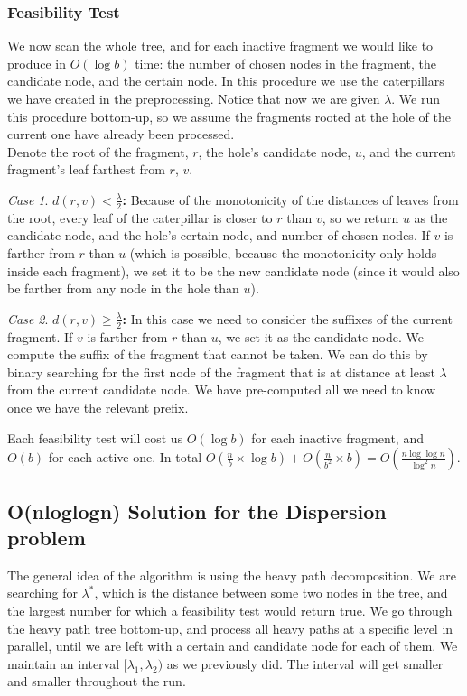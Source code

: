 \documentclass[11pt,a4paper]{article}
\theoremstyle{definition}
\theoremstyle{remark}
\newtheorem{case}{Case}
\begin{document}
\subsubsection{Feasibility Test} %
We now scan the whole tree, and for each inactive fragment we would like to produce in $O(\log b)$ time: the number of chosen nodes in the fragment, the candidate node, and the certain node. In this procedure we use the caterpillars we have created in the preprocessing. Notice that now we are given $\lambda$.
We run this procedure bottom-up, so we assume the fragments rooted at the hole of the current one have already been processed.\\
Denote the root of the fragment, $r$, the hole's candidate node, $u$, and the current fragment's leaf farthest from $r$, $v$.\\
\begin{case}
\textbf{$d(r,v) < \frac{\lambda}{2}$:} Because of the monotonicity of the distances of leaves from the root, every leaf of the caterpillar is closer to $r$ than $v$, so we return $u$ as the candidate node, and the hole's certain node, and number of chosen nodes. If $v$ is farther from $r$ than $u$ (which is possible, because the monotonicity only holds inside each fragment), we set it to be the new candidate node (since it would also be farther from any node in the hole than $u$).
\end{case}
\begin{case}
\textbf{$d(r,v) \geq \frac{\lambda}{2}$:}
In this case we need to consider the suffixes of the current fragment. If $v$ is farther from $r$ than $u$, we set it as the candidate node. We compute the suffix of the fragment that cannot be taken. We can do this by binary searching for the first node of the fragment that is at distance at least $\lambda$ from the current candidate node. We have pre-computed all we need to know once we have the relevant prefix.
\end{case}
Each feasibility test will cost us $O(\log b)$ for each inactive fragment, and $O(b)$ for each active one. In total $O(\frac{n}{b} \times \log b) + O(\frac{n}{b^2} \times b) = O(\frac{n \log \log n}{\log ^2n})$.


\subsection{O(nloglogn) Solution for the Dispersion problem} \label{nloglogn solution}
The general idea of the algorithm is using the heavy path decomposition. We are searching for $\lambda^*$, which is the distance between some two nodes in the tree, and the largest number for which a feasibility test would return true.
We go through the heavy path tree bottom-up, and process all heavy paths at a specific level in parallel, until we are left with a certain and candidate node for each of them. We maintain an interval $[\lambda_1,\lambda_2)$ as we previously did. The interval will get smaller and smaller throughout the run.
\end{document}
